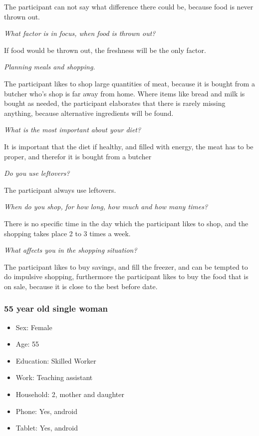 The participant can not say what difference there could be, because food is never thrown out.

\emph{What factor is in focus, when food is thrown out?}

If food would be thrown out, the freshness will be the only factor.

\emph{Planning meals and shopping.}

The participant likes to shop large quantities of meat, because it is bought from a butcher who's shop is far away from home. Where items like bread and milk is bought as needed, the participant elaborates that there is rarely missing anything, because alternative ingredients will be found.

\emph{What is the most important about your diet?}

It is important that the diet if healthy, and filled with energy, the meat has to be proper, and therefor it is bought from a butcher

\emph{Do you use leftovers?}

The participant always use leftovers.

\emph{When do you shop, for how long, how much and how many times?}

There is no specific time in the day which the participant likes to shop, and the shopping takes place 2 to 3 times a week.

\emph{What affects you in the shopping situation?}

The participant likes to buy savings, and fill the freezer, and can be tempted to do impulsive shopping, furthermore the participant likes to buy the food that is on sale, because it is close to the best before date.

\subsubsection{55 year old single woman}
\begin{itemize}
  \item Sex: Female
  \item Age: 55
  \item Education: Skilled Worker
  \item Work: Teaching assistant
  \item Household: 2, mother and daughter
  \item Phone: Yes, android
  \item Tablet: Yes, android
\end{itemize}

